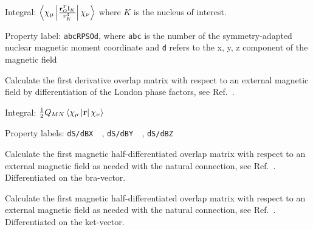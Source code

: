 \begin{description}
\begin{list}{}{}
\item Integral:
$\left<\chi_{\mu}\left|\frac{{\bf r}_O^T{\bf l}_K}{r_{K}^{3}}\right|\chi_{\nu}\right>$
where $K$ is the nucleus of interest.
\item Property label: \verb|abcRPSOd|, where \verb|abc| is the number
of the symmetry-adapted nuclear magnetic moment coordinate and \verb|d| refers to the
x, y, z component of the magnetic field
\end{list}


\item[\Key{S1MAG}] Calculate the first derivative overlap
matrix with respect to an
external magnetic field by differentiation
of the London phase factors, see Ref.~\cite{thpjjcp95}.

\begin{list}{}{}
\item Integral: $\frac{1}{2}Q_{MN}\left<\chi_{\mu}\left|{\bf
r}\right|\chi_{\nu}\right>$
\item Property labels: \verb|dS/dBX  |, \verb|dS/dBY  |,
\verb|dS/dBZ  |
\end{list}

\item[\Key{S1MAGL}] Calculate the first magnetic half-differentiated overlap
matrix with respect to an
external magnetic field as needed with the
natural connection, see
Ref.~\cite{krthklbpjjocp195}. Differentiated
on the bra-vector.


\item[\Key{S1MAGR}] Calculate the first magnetic half-differentiated overlap
matrix with respect to an external magnetic field as needed with the
natural connection, see Ref.~\cite{krthklbpjjocp195}. Differentiated on
the ket-vector.



\end{description}
